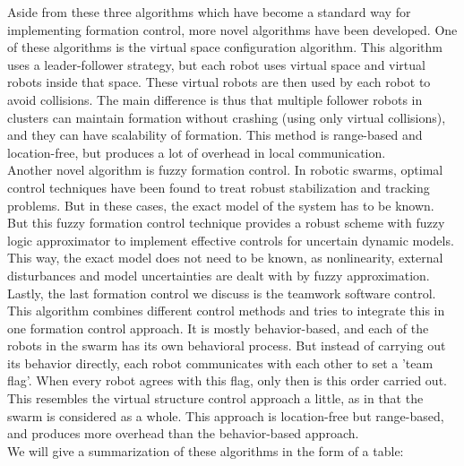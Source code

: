 Aside from these three algorithms which have become a standard way for implementing formation control, more novel algorithms have been developed. 
One of these algorithms is the virtual space configuration algorithm. \cite{wee2013formation}
This algorithm uses a leader-follower strategy, but each robot uses virtual space and virtual robots inside that space.
These virtual robots are then used by each robot to avoid collisions. 
The main difference is thus that multiple follower robots in clusters can maintain formation without crashing (using only virtual collisions), and they can have scalability of formation. 
This method is range-based and location-free, but produces a lot of overhead in local communication.\\ 

Another novel algorithm is fuzzy formation control.\cite{ranjbar2012novel}
In robotic swarms, optimal control techniques have been found to treat robust stabilization and tracking problems. 
But in these cases, the exact model of the system has to be known. 
But this fuzzy formation control technique provides a robust scheme with fuzzy logic approximator to implement effective controls for uncertain dynamic models.
This way, the exact model does not need to be known, as nonlinearity, external disturbances and model uncertainties are dealt with by fuzzy approximation. \\

Lastly, the last formation control we discuss is the teamwork software control. \cite{kaminka2013use}
This algorithm combines different control methods and tries to integrate this in one formation control approach.
It is mostly behavior-based, and each of the robots in the swarm has its own behavioral process. 
But instead of carrying out its behavior directly, each robot communicates with each other to set a 'team flag'. 
When every robot agrees with this flag, only then is this order carried out. 
This resembles the virtual structure control approach a little, as in that the swarm is considered as a whole. 
This approach is location-free but range-based, and produces more overhead than the behavior-based approach. \\

We will give a summarization of these algorithms in the form of a table:


